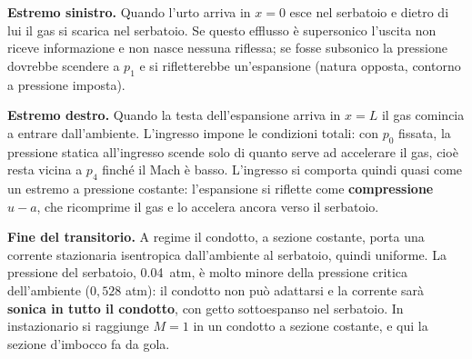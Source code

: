 \documentclass[11pt,a4paper]{article}
\newcommand{\uma}{u-a}
\begin{document}
\textbf{Estremo sinistro.} Quando l'urto arriva in $x=0$ esce nel serbatoio e dietro di lui il gas si scarica nel
serbatoio. Se questo efflusso è supersonico l'uscita non riceve informazione e non nasce nessuna riflessa; se fosse
subsonico la pressione dovrebbe scendere a $p_1$ e si rifletterebbe un'espansione (natura opposta, contorno a
pressione imposta).

\textbf{Estremo destro.} Quando la testa dell'espansione arriva in $x=L$ il gas comincia a entrare dall'ambiente.
L'ingresso impone le condizioni totali: con $p_0$ fissata, la pressione statica all'ingresso scende solo di quanto
serve ad accelerare il gas, cioè resta vicina a $p_4$ finché il Mach è basso. L'ingresso si comporta quindi quasi
come un estremo a pressione costante: l'espansione si riflette come \textbf{compressione $\uma$}, che ricomprime il
gas e lo accelera ancora verso il serbatoio.

\textbf{Fine del transitorio.} A regime il condotto, a sezione costante, porta una corrente stazionaria
isentropica dall'ambiente al serbatoio, quindi uniforme. La pressione del serbatoio, \SI{0.04}{atm}, è molto
minore della pressione critica dell'ambiente ($0{,}528$ atm): il condotto non può adattarsi e la corrente sarà
\textbf{sonica in tutto il condotto}, con getto sottoespanso nel serbatoio. In instazionario si raggiunge $M=1$ in
un condotto a sezione costante, e qui la sezione d'imbocco fa da gola.

\end{document}
